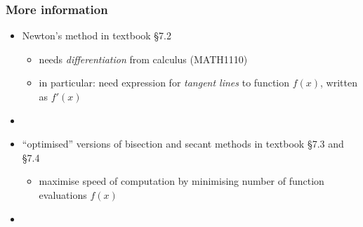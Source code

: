 \documentclass[english,14pt]{beamer}
\newcommand\red[1]{{\color{red} #1}}
\begin{document}

\begin{frame}[fragile]

\frametitle{More information}
\begin{itemize}
	\item Newton's method in textbook \red{\S7.2}
	\begin{itemize}
		\item needs \emph{differentiation} from calculus (MATH1110)
		\item in particular: need expression for \emph{tangent lines} to function $f(x)$, written as $f'(x)$
	\end{itemize}

	\item[]
	
	\item ``optimised'' versions of bisection and secant methods in textbook \red{\S7.3} and \red{\S7.4}
	\begin{itemize}
		\item maximise speed of computation by minimising number of function evaluations $f(x)$
	\end{itemize}
	
	\item[]
	
\end{itemize}

\end{frame}
\end{document}
